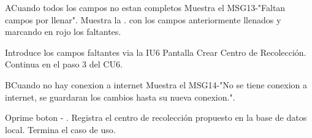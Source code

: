 \begin{UCtrayectoriaA}{A}{Cuando todos los campos no estan completos}
	\UCpaso Muestra el MSG13-"Faltan campos por llenar".
	\UCpaso Muestra la . con los campos anteriormente llenados y marcando en rojo los faltantes.
	\item\UCactor Introduce los campos faltantes via la IU6 Pantalla Crear Centro de Recolección.
	\UCpaso Continua en el paso 3 del CU6.
\end{UCtrayectoriaA}

\begin{UCtrayectoriaA}{B}{Cuando no hay conexion a internet}
	\UCpaso Muestra el MSG14-"No se tiene conexion a internet, se guardaran los cambios hasta su nueva conexion.".
	\item\UCactor Oprime boton - .
	\UCpaso Registra el centro de recolección propuesto  en la base de datos local.	
	\UCpaso[] Termina el caso de uso.
\end{UCtrayectoriaA}
 
 

 
 
